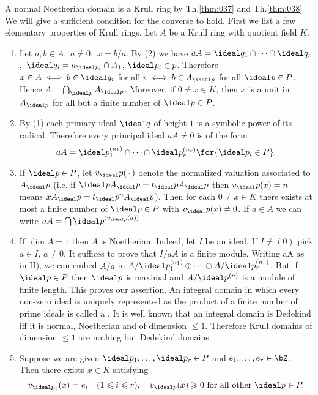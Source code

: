 \documentclass[../main]{subfiles}
\begin{document}
A normal Noetherian domain is a Krull ring by Th.\ref{thm:037} and Th.\ref{thm:038} We will give a sufficient condition for the converse to hold. First we list a few elementary properties of Krull rings. Let $A$ be a Krull ring with quotient field $K$.
\begin{enumerate}[label=\Roman*)]
    \item Let $a, b \in A$, $\, a \neq 0$, $\, x=b / a$. By (2) we have $aA =\ideal q_1 \cap \cdots \cap \ideal q_r$, $\,\ideal q_i=a_{\ideal p_i} \cap A_1$, $\ideal p_i \in p$. Therefore $x \in A\iff b \in \ideal q_i$ for all $i$ $\iff b \in A_{\ideal p}$ for all $\ideal p \in P$. Hence $A=\bigcap_{\ideal p} A_{\ideal p}$. Moreover, if $0 \neq x \in K$, then $x$ is a unit in $A_{\ideal p}$ for all but a finite number of $\ideal p \in P$.
    \item By (1) each primary ideal $\ideal q$ of height $1$ is a symbolic power of its radical. Therefore every principal ideal $aA \neq 0$ is of the form \[a A=\ideal p_1^{(n_1)} \cap \cdots \cap \ideal p_r^{(n_r)}\for{\ideal p_i \in P}.\]
    \item If $\ideal p \in P$, let $v_\ideal p(\,\cdot\,)$ denote the normalized valuation associated to $A_\ideal p$ (i.e. if $\ideal p A_\ideal p=t_\ideal p A_\ideal p$ then $v_\ideal p(x)=n$ means $xA_\ideal p=t_\ideal p^nA_\ideal p$). Then for each $0 \neq x \in K$ there exists at most a finite number of $\ideal p \in P$ with $v_\ideal p(x) \neq 0$. If $a \in A$ we can write $aA=\bigcap {\ideal p}^{(v_{\ideal p}(a))}$.
    \item If $\dim A=1$ then $A$ is Noetherian. Indeed, let $I$ be an ideal. If $I \neq(0)$ pick $a \in I$, $a \neq 0$. It suffices to prove that $I/aA$ is a finite module. Writing aA as in II), we can embed $A/a$ in $A/\ideal p_1^{(n_1)}\oplus\cdots\oplus A/\ideal p_r^{(n_r)}$. But if $\ideal p \in P$ then $\ideal p$ is maximal and $A / \ideal p^{(n)}$ is a module of finite length. This proves our assertion. An integral domain in which every non-zero ideal is uniquely represented as the product of a finite number of prime ideals is called a . It is well known that an integral domain is Dedekind iff it is normal, Noetherian and of dimension $\leqslant 1$. Therefore Krull domains of dimension $\leqslant 1$ are nothing but Dedekind domains.
    \item Suppose we are given $\ideal p_1, \ldots, \ideal p_r \in P$ and $e_1, \ldots, e_r \in \bZ$. Then there exists $x \in K$ satisfying \[v_{\ideal p_1}(x)=e_i\quad(1 \leqslant i \leqslant r), \quad v_{\ideal p}(x) \geqslant 0\text{ for all other }\ideal p \in P.\]
\end{enumerate}
\end{document}
